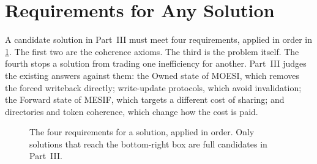 \section{Requirements for Any Solution}
\label{sec:prob-requirements}
\label{sec:prob-bridge}
%

A candidate solution in Part~III must meet four requirements, applied in order
in \cref{fig:req-tree}. The first two are the coherence axioms. The third is the
problem itself. The fourth stops a solution from trading one inefficiency for
another. Part~III judges the existing answers against them: the Owned state of
MOESI, which removes the forced writeback directly; write-update protocols, which
avoid invalidation; the Forward state of MESIF, which targets a different cost of
sharing; and directories and token coherence, which change how the cost is paid.

\begin{figure}[htbp]
\centering
{}
\caption[Decision tree: requirements for a solution]{The four requirements for a
solution, applied in order. Only solutions that reach the bottom-right box are
full candidates in Part~III.}
\label{fig:req-tree}
\end{figure}

